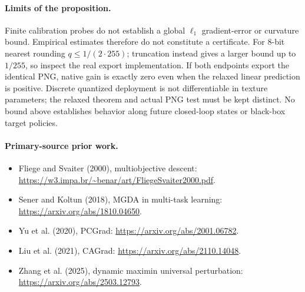 \documentclass[10pt]{article}
\begin{document}
\paragraph{Limits of the proposition.}
Finite calibration probes do not establish a global $\ell_1$ gradient-error or
curvature bound. Empirical estimates therefore do not constitute a certificate.
For 8-bit nearest rounding $q\leq1/(2\cdot255)$; truncation instead gives a
larger bound up to $1/255$, so inspect the real export implementation. If both
endpoints export the identical PNG, native gain is exactly zero even when the
relaxed linear prediction is positive. Discrete quantized deployment is not
differentiable in texture parameters; the relaxed theorem and actual PNG test
must be kept distinct. No bound above establishes behavior along future
closed-loop states or black-box target policies.

\paragraph{Primary-source prior work.}
\begin{itemize}
\item Fliege and Svaiter (2000), multiobjective descent:
\url{https://w3.impa.br/~benar/art/FliegeSvaiter2000.pdf}.
\item Sener and Koltun (2018), MGDA in multi-task learning:
\url{https://arxiv.org/abs/1810.04650}.
\item Yu et al. (2020), PCGrad:
\url{https://arxiv.org/abs/2001.06782}.
\item Liu et al. (2021), CAGrad:
\url{https://arxiv.org/abs/2110.14048}.
\item Zhang et al. (2025), dynamic maximin universal perturbation:
\url{https://arxiv.org/abs/2503.12793}.
\end{itemize}
\end{document}
